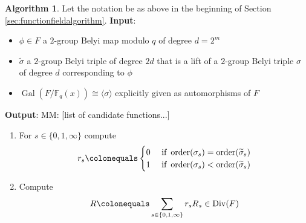 \documentclass{dcthesis}
\newcommand{\mm}[1]{{\color{blue} \sf MM: [#1]}}
\newcommand{\wt}[1]{\widetilde{#1}}
\newcommand{\FF}{\mathbb{F}}
\DeclareMathOperator{\Div}{Div}
\DeclareMathOperator{\order}{order}
\DeclareMathOperator{\Gal}{Gal}
\numberwithin{equation}{section}
\theoremstyle{definition}
\newtheorem{alg}[equation]{Algorithm}
\theoremstyle{remark}
\begin{document}
{{\begin{alg}
      \label{alg:getcandidates}
      Let the notation be
      as above in the beginning of
      Section
      \ref{sec:functionfieldalgorithm}.
      \newline
      \textbf{Input}:
      \begin{itemize}
        \item 
          $\phi\in F$
          a $2$-group Belyi map modulo $q$
          of degree $d=2^m$
        \item
          $\wt{\sigma}$ a $2$-group Belyi triple
          of degree $2d$
          that is a lift of
          a $2$-group Belyi triple
          $\sigma$
          of degree $d$
          corresponding
          to $\phi$
        \item
          $\Gal(F/\FF_q(x))\cong
          \langle\sigma\rangle$
          explicitly given
          as automorphisms of $F$
      \end{itemize}
      \textbf{Output}:
      \mm{list of candidate functions...}
      \begin{enumerate}
        \item\label{alg:gencandidates_setup}
          For $s\in\{0,1,\infty\}$
          compute
          \begin{align}
            \label{eqn:ramcoeffs}
            r_s\colonequals
            \begin{cases}
              0&
              \text{ if }
              \order(\sigma_s)=
              \order(\wt{\sigma}_s)\\
              1&
              \text{ if }
              \order(\sigma_s)<
              \order(\wt{\sigma}_s)\\
            \end{cases}
          \end{align}
        \item\label{alg:getcandidates_getram}
          Compute
          \begin{equation}
            \label{eqn:ramdivisor}
            R\colonequals
            \sum_{s\in\{0,1,\infty\}}r_sR_s
            \in\Div(F)

\end{equation}
\end{enumerate}
\end{alg}}}
\end{document}
